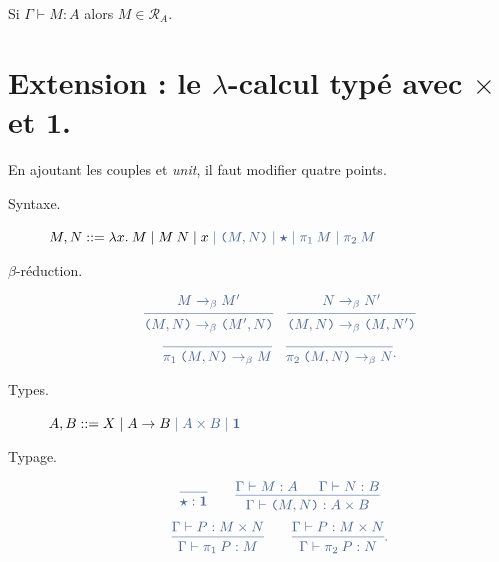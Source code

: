 \documentclass[./main]{subfiles}
\begin{document}
  \begin{crlr}
    Si $\Gamma \vdash M : A$ alors $M \in \mathcal{R}_A$.
  \end{crlr}

  \section{Extension : le $\lambda$-calcul typé avec $\times$ et $\mathbf{1}$.}
  En ajoutant les couples et \textit{unit}, il faut modifier quatre points.
  \begin{description}
    \item[Syntaxe.] \hfill $M, N ::= \lambda x.\: M  \mid M \: N  \mid x {\color{deepblue} {}\mid \texttt{(} M, N \texttt{)}  \mid \boldsymbol{\star} \mid \pi_1 \: M  \mid \pi_2 \: M}$ \hfill~
    \item[$\beta$-réduction.]
      \[
        \color{deepblue}
      \begin{prooftree} \hypo{M \to_\beta M'} \infer 1{\texttt{(} M, N \texttt{)} \to_\beta \texttt{(} M', N \texttt{)}} \end{prooftree} \quad
      \begin{prooftree} \hypo{N \to_\beta N'} \infer 1{\texttt{(} M, N \texttt{)} \to_\beta \texttt{(} M, N' \texttt{)}} \end{prooftree}\]
      \[
        \color{deepblue}
        \begin{prooftree} \infer 0{\pi_1 \: \texttt{(} M, N \texttt{)} \to_\beta M} \end{prooftree} \quad
        \begin{prooftree} \infer 0{\pi_2 \: \texttt{(} M, N \texttt{)} \to_\beta N} \end{prooftree}
      .\] 
    \item[Types.] \hfill $A, B ::= X  \mid A \to B {\color{deepblue} {} \mid A \times B  \mid \mathbf{1}}$ \hfill~
    \item[Typage.]
      \[
        \color{deepblue}
      \begin{prooftree}
        \infer 0{\boldsymbol{\star} : \mathbf{1}}
      \end{prooftree}
      \quad\quad
      \begin{prooftree}
        \hypo{\Gamma \vdash M : A}
        \hypo{\Gamma \vdash N : B}
        \infer 2{\Gamma \vdash \texttt{(} M, N \texttt{)} : A \times B}
      \end{prooftree}
      \] 
      \[
        \color{deepblue}
      \begin{prooftree}
        \hypo{\Gamma \vdash P : M \times N}
        \infer 1{\Gamma \vdash \pi_1 \: P : M}
      \end{prooftree}
      \quad\quad
      \begin{prooftree}
        \hypo{\Gamma \vdash P : M \times N}
        \infer 1{\Gamma \vdash \pi_2 \: P : N}
      \end{prooftree}
      .\]
  \end{description}
\end{document}
